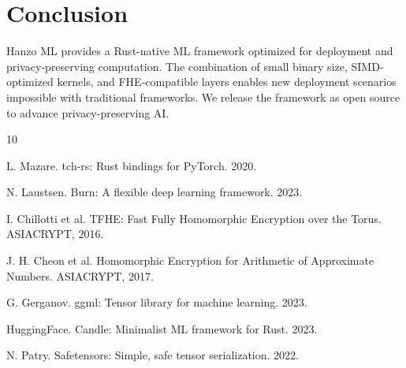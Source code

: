 \section{Conclusion}


Hanzo ML provides a Rust-native ML framework optimized for deployment and privacy-preserving computation. The combination of small binary size, SIMD-optimized kernels, and FHE-compatible layers enables new deployment scenarios impossible with traditional frameworks. We release the framework as open source to advance privacy-preserving AI.


\begin{thebibliography}{10}

L. Mazare. tch-rs: Rust bindings for PyTorch. 2020.

N. Laustsen. Burn: A flexible deep learning framework. 2023.

I. Chillotti et al. TFHE: Fast Fully Homomorphic Encryption over the Torus. ASIACRYPT, 2016.

J. H. Cheon et al. Homomorphic Encryption for Arithmetic of Approximate Numbers. ASIACRYPT, 2017.

G. Gerganov. ggml: Tensor library for machine learning. 2023.

HuggingFace. Candle: Minimalist ML framework for Rust. 2023.

N. Patry. Safetensors: Simple, safe tensor serialization. 2022.

\end{thebibliography}

